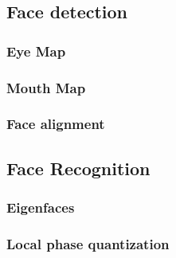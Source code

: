 \subsection{Face detection}
\subsubsection{Eye Map}
\label{sub:FaceDetection}


\subsubsection{Mouth Map}


\subsubsection{Face alignment}


\subsection{Face Recognition}
\label{sub:FaceRecognition}


\subsubsection{Eigenfaces}
\label{subs:Eigenfaces}


\subsubsection{Local phase quantization}
\label{subs:LocalPhaseQuantization}

